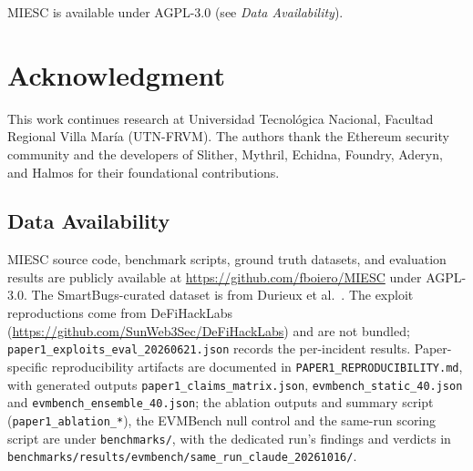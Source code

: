 \documentclass[conference]{IEEEtran}
\begin{document}
MIESC is available under AGPL-3.0 (see \emph{Data Availability}).

\section*{Acknowledgment}

This work continues research at Universidad Tecnol\'ogica Nacional, Facultad Regional Villa Mar\'ia (UTN-FRVM). The authors thank the Ethereum security community and the developers of Slither, Mythril, Echidna, Foundry, Aderyn, and Halmos for their foundational contributions.

\subsection*{Data Availability}

{\sloppy MIESC source code, benchmark scripts, ground truth datasets, and evaluation results are publicly available at \url{https://github.com/fboiero/MIESC} under AGPL-3.0. The SmartBugs-curated dataset is from Durieux et al.~\cite{durieux2020empirical}. The exploit reproductions come from DeFiHackLabs (\url{https://github.com/SunWeb3Sec/DeFiHackLabs}) and are not bundled; \texttt{paper1\_exploits\_eval\_20260621.json} records the per-incident results. Paper-specific reproducibility artifacts are documented in \texttt{PAPER1\_REPRODUCIBILITY.md}, with generated outputs \texttt{paper1\_claims\_matrix.json}, \texttt{evmbench\_static\_40.json} and \texttt{evmbench\_ensemble\_40.json}; the ablation outputs and summary script (\texttt{paper1\_ablation\_*}), the EVMBench null control and the same-run scoring script are under \texttt{benchmarks/}, with the dedicated run's findings and verdicts in \nolinkurl{benchmarks/results/evmbench/same_run_claude_20261016/}.\par}



\end{document}
